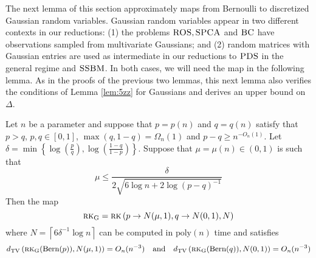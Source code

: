 The next lemma of this section approximately maps from Bernoulli to discretized Gaussian random variables. Gaussian random variables appear in two different contexts in our reductions: (1) the problems $\textsc{ROS}, \textsc{SPCA}$ and $\textsc{BC}$ have observations sampled from multivariate Gaussians; and (2) random matrices with Gaussian entries are used as intermediate in our reductions to $\textsc{PDS}$ in the general regime and $\textsc{SSBM}$. In both cases, we will need the map in the following lemma. As in the proofs of the previous two lemmas, this next lemma also verifies the conditions of Lemma \ref{lem:5zz} for Gaussians and derives an upper bound on $\Delta$.

\begin{lemma} \label{lem:5c}
Let $n$ be a parameter and suppose that $p = p(n)$ and $q = q(n)$ satisfy that $p > q$, $p, q \in [0, 1]$, $\max(q, 1 - q) = \Omega_n(1)$ and $p - q \ge n^{-O_n(1)}$. Let $\delta = \min \left\{ \log \left( \frac{p}{q} \right), \log \left( \frac{1 - q}{1 - p} \right) \right\}$. Suppose that $\mu = \mu(n) \in (0, 1)$ is such that
$$\mu \le \frac{\delta}{2 \sqrt{6\log n + 2\log (p-q)^{-1}}}$$
Then the map
$$\textsc{rk}_{\text{G}} = \textsc{rk}\left(p \to N(\mu, 1), q \to N(0, 1), N \right)$$
where $N = \left\lceil 6\delta^{-1} \log n \right\rceil$ can be computed in $\text{poly}(n)$ time and satisfies
$$d_{\text{TV}}\left(\textsc{rk}_{\text{G}}(\text{Bern}(p)), N(\mu, 1) \right) = O_n(n^{-3}) \quad \text{and} \quad d_{\text{TV}}\left(\textsc{rk}_{\text{G}}(\text{Bern}(q)), N(0, 1) \right) = O_n(n^{-3})$$
\end{lemma}

